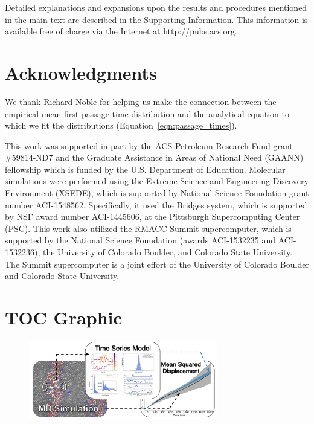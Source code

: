 \documentclass[aps,pre,preprint,groupedaddress]{revtex4-2}
\begin{document}
  Detailed explanations and expansions upon the results and procedures mentioned in
  the main text are described in the Supporting Information. This information is
  available free of charge via the Internet at http://pubs.acs.org.

  \section*{Acknowledgments}
  
  We thank Richard Noble for helping us make the connection between the empirical 
  mean first passage time distribution and the analytical equation to which we fit
  the distributions (Equation~\ref{eqn:passage_times}).
  
  This work was supported in part by the ACS Petroleum Research Fund grant \#59814-ND7
  and the Graduate Assistance in Areas of National Need (GAANN)
  fellowship which is funded by the U.S. Department of Education.
  Molecular simulations were performed using the Extreme Science and
  Engineering Discovery Environment (XSEDE), which is supported by National
  Science Foundation grant number ACI-1548562. Specifically, it used the Bridges
  system, which is supported by NSF award number ACI-1445606, at the Pittsburgh
  Supercomputing Center (PSC). This work also utilized the RMACC Summit supercomputer,
  which is supported by the National Science Foundation (awards ACI-1532235 and
  ACI-1532236), the University of Colorado Boulder, and Colorado State
  University. The Summit supercomputer is a joint effort of the University of
  Colorado Boulder and Colorado State University.

  
  

  \section*{TOC Graphic}
    
  \begin{figure}[!htb]
  \centering
  \includegraphics[width=3.25in]{toc.pdf}
  \end{figure}
\end{document}
